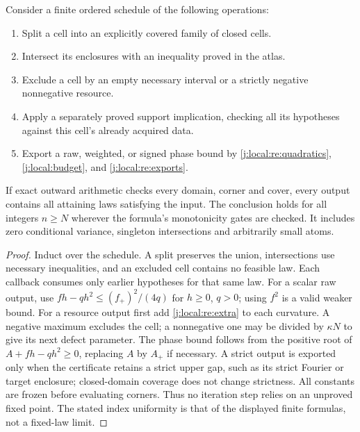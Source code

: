 \begin{theorem}\label{j:local:acquisition}
Consider a finite ordered schedule of the following operations:
\begin{enumerate}
\item Split a cell into an explicitly covered family of closed cells.
\item Intersect its enclosures with an inequality proved in the atlas.
\item Exclude a cell by an empty necessary interval or a strictly
negative nonnegative resource.
\item Apply a separately proved support implication,
checking all its hypotheses against this cell's already acquired data.
\item Export a raw, weighted, or signed phase bound by
\eqref{j:local:re:quadratics}, \eqref{j:local:budget}, and \eqref{j:local:re:exports}.
\end{enumerate}
If exact outward arithmetic checks every domain, corner and cover,
every output contains all attaining laws satisfying the input. The
conclusion holds for all integers $n\ge N$ wherever the formula's
monotonicity gates are checked. It includes zero conditional variance,
singleton intersections and arbitrarily small atoms.
\end{theorem}
\begin{proof}
Induct over the schedule. A split preserves the union, intersections use
necessary inequalities, and an excluded cell contains no feasible law.
Each callback consumes only earlier hypotheses for that same law.
For a scalar raw output, use
$fh-qh^2\le(f_+)^2/(4q)$ for $h\ge0$, $q>0$; using $f^2$ is a valid
weaker bound. For a resource output first add \eqref{j:local:re:extra} to each
curvature. A negative maximum excludes the cell; a nonnegative one may
be divided by $\kappa N$ to give its next defect parameter.
The phase bound follows from the positive root of
$A+fh-qh^2\ge0$, replacing $A$ by $A_+$ if necessary.
A strict output is exported only when the certificate retains a strict
upper gap, such as its strict Fourier or target enclosure; closed-domain
coverage does not change strictness. All constants are frozen before evaluating
corners. Thus no iteration
step relies on an unproved fixed point. The stated index uniformity is
that of the displayed finite formulas, not a fixed-law limit.
\end{proof}


